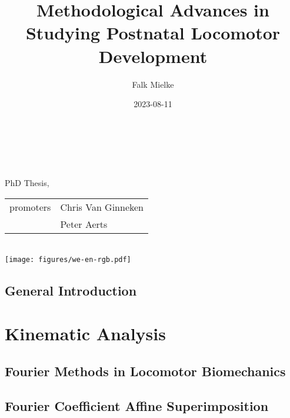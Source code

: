 \documentclass[12pt,a4paper,twoside]{report}
\title{Methodological Advances \linebreak in \linebreak Studying Postnatal Locomotor Development}
\author{Falk Mielke}
\date{2023-08-11}
\newcommand\cleartoleftpage{%
  \ifodd\value{page}\else\hbox{}\cleardoublepage\fi
}
\newcommand\cleartorightpage{%
\ifodd\value{page}\hbox{}\clearpage\else\hbox{}\cleardoublepage\fi
\hbox{}
}
\begin{document}
\doublespacing
\makeatletter
    \begin{titlepage}
    \begin{spacing}{2}
        \begin{center}
        	\ \vspace{3cm}\\
            {\LARGE \bfseries  \@title }\\[6ex] 
            {\large  \@author}\\[8ex] 
            { PhD Thesis, \@date }\\[8ex] 
            \begin{tabular}{r | l}
              promoters & Chris Van Ginneken
               \\ & Peter Aerts
			\end{tabular}\\[12ex]
            {\texttt{[image: figures/we-en-rgb.pdf]}\\[4ex]}
        \end{center}
        \end{spacing}
    \end{titlepage}
\makeatother
\thispagestyle{empty}

\singlespacing
\newpage
\setcounter{tocdepth}{1}
\tableofcontents

\cleartoleftpage
\chapter{General Introduction}\label{cpt:generalintro}
\clearpage




\cleartorightpage
\part{Kinematic Analysis}\label{pt:1}
\chapter{Fourier Methods in Locomotor Biomechanics}\label{cpt:fourier_review}


\cleartoleftpage
\chapter{Fourier Coefficient Affine Superimposition}\label{cpt:fcas}

\end{document}
